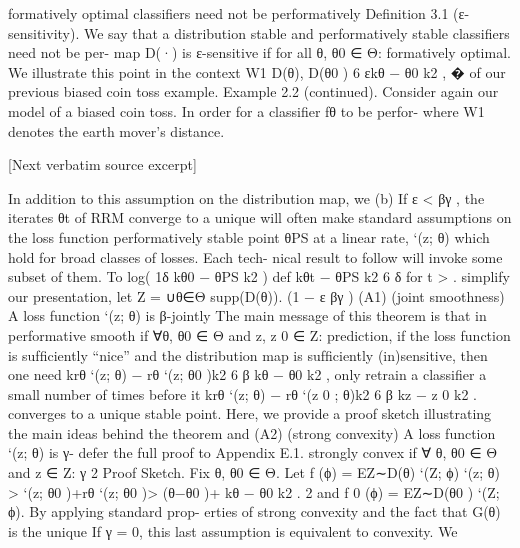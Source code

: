 \documentclass[10pt]{article}
\begin{document}
\begin{ReviewVerbatim}

formatively optimal classiﬁers need not be performatively            Deﬁnition 3.1 (ε-sensitivity). We say that a distribution
stable and performatively stable classiﬁers need not be per-         map D(·) is ε-sensitive if for all θ, θ0 ∈ Θ:
formatively optimal. We illustrate this point in the context
                                                                                   W1 D(θ), D(θ0 ) 6 εkθ − θ0 k2 ,
                                                                                     �
of our previous biased coin toss example.
Example 2.2 (continued). Consider again our model of
a biased coin toss. In order for a classiﬁer fθ to be perfor-        where W1 denotes the earth mover’s distance.

[Next verbatim source excerpt]

In addition to this assumption on the distribution map, we          (b) If ε < βγ , the iterates θt of RRM converge to a unique
will often make standard assumptions on the loss function               performatively stable point θPS at a linear rate,
`(z; θ) which hold for broad classes of losses. Each tech-
nical result to follow will invoke some subset of them. To                                                log( 1δ kθ0 − θPS k2 )
                                 def                                         kθt − θPS k2 6 δ for t >                              .
simplify our presentation, let Z = ∪θ∈Θ supp(D(θ)).                                                             (1 − ε βγ )
(A1) (joint smoothness) A loss function `(z; θ) is β-jointly       The main message of this theorem is that in performative
     smooth if ∀θ, θ0 ∈ Θ and z, z 0 ∈ Z:                          prediction, if the loss function is sufﬁciently “nice” and the
                                                                   distribution map is sufﬁciently (in)sensitive, then one need
           krθ `(z; θ) − rθ `(z; θ0 )k2 6 β kθ − θ0 k2 ,
                                                                   only retrain a classiﬁer a small number of times before it
           krθ `(z; θ) − rθ `(z 0 ; θ)k2 6 β kz − z 0 k2 .         converges to a unique stable point. Here, we provide a proof
                                                                   sketch illustrating the main ideas behind the theorem and
(A2) (strong convexity) A loss function `(z; θ) is γ-
                                                                   defer the full proof to Appendix E.1.
     strongly convex if ∀ θ, θ0 ∈ Θ and z ∈ Z:
                                                γ         2        Proof Sketch. Fix θ, θ0 ∈ Θ. Let f (ϕ) = EZ∼D(θ) `(Z; ϕ)
      `(z; θ) > `(z; θ0 )+rθ `(z; θ0 )> (θ−θ0 )+ kθ − θ0 k2 .
                                                2                  and f 0 (ϕ) = EZ∼D(θ0 ) `(Z; ϕ). By applying standard prop-
                                                                   erties of strong convexity and the fact that G(θ) is the unique
If γ = 0, this last assumption is equivalent to convexity. We


\end{ReviewVerbatim}
\end{document}
